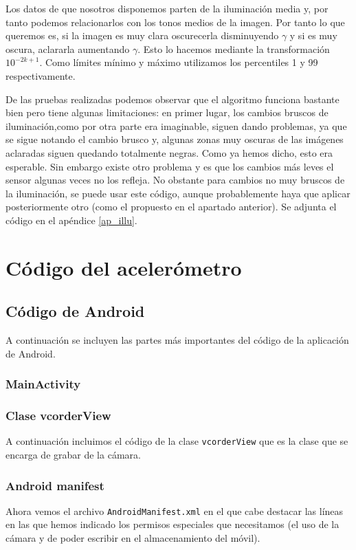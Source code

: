 \documentclass[a4paper,openright, 12pt]{book}
\begin{document}
Los datos de que nosotros disponemos parten de la iluminación media y, por tanto podemos relacionarlos con los tonos medios de la imagen. Por tanto lo que queremos es, si la imagen es muy clara oscurecerla disminuyendo $\gamma$ y si es muy oscura, aclararla aumentando $\gamma$.
Esto lo hacemos mediante la transformación $10^{-2k+1}$.
Como límites mínimo y máximo utilizamos los percentiles 1 y 99 respectivamente.

De las pruebas realizadas podemos observar que el algoritmo funciona bastante bien pero tiene algunas limitaciones: en primer lugar, los cambios bruscos de iluminación,como por otra parte era imaginable, siguen dando problemas, ya que se sigue notando el cambio brusco y, algunas zonas muy oscuras de las imágenes aclaradas siguen quedando totalmente negras. Como ya hemos dicho, esto era esperable. Sin embargo existe otro problema y es que los cambios más leves el sensor algunas veces no los refleja. 
No obstante para cambios no muy bruscos de la iluminación, se puede usar este código, aunque probablemente haya que aplicar posteriormente otro (como el propuesto en el apartado anterior).
Se adjunta el código en el apéndice \ref{ap_illu}.
\appendix
\chapter{Código del acelerómetro} 
\section{Código de Android} \label{android_ap_acc}
A continuación se incluyen las partes más importantes del código de la aplicación de Android.

\subsection{MainActivity}


\newpage

\subsection{Clase vcorderView}
A continuación incluimos el código de la clase \lstinline|vcorderView| que es la clase que se encarga de grabar de la cámara.

\newpage
\subsection{Android manifest}
Ahora vemos el archivo \lstinline|AndroidManifest.xml| en el que cabe destacar las líneas en las que hemos indicado los permisos especiales que necesitamos (el uso de la cámara y de poder escribir en el almacenamiento del móvil).

\end{document}
